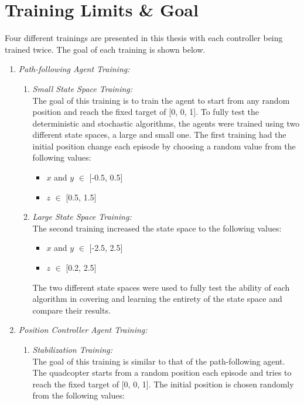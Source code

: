     \section{Training Limits \& Goal}
    Four different trainings are presented in this thesis with each controller being trained twice. The goal of each training is shown below.
\begin{enumerate}[label={\textit{\alph*)}}]
    \item{\textit{Path-following Agent Training:}}
    \begin{enumerate}[label={\textit{\arabic*.}}]
    \item \textit{Small State Space Training:}\\
    The goal of this training is to train the agent to start from any random position and reach the fixed target of [0, 0, 1]. To fully test the deterministic and stochastic algorithms, the agents were trained using two different state spaces, a large and small one. The first training had the initial position change each episode by choosing a random value from the following values:
    \begin{itemize}
        \item \(x\) and \(y\) \(\in\) [-0.5, 0.5]
        \item \(z\) \(\in\) [0.5, 1.5]
    \end{itemize}
    \item \textit{Large State Space Training:}\\
    The second training increased the state space to the following values:
    \begin{itemize}
        \item \(x\) and \(y\) \(\in\) [-2.5, 2.5]
        \item \(z\) \(\in\) [0.2, 2.5]
    \end{itemize}
    The two different state spaces were used to fully test the ability of each algorithm in covering and learning the entirety of the state space and compare their results.
    \end{enumerate}
    \item{\textit{Position Controller Agent Training:}}
    \begin{enumerate}[label={\textit{\arabic*.}}]
        \item \textit{Stabilization Training:}\\
    The goal of this training is similar to that of the path-following agent. The quadcopter starts from a random position each episode and tries to reach the fixed target of [0, 0, 1]. The initial position is chosen randomly from the following values:

\end{enumerate}
\end{enumerate}
